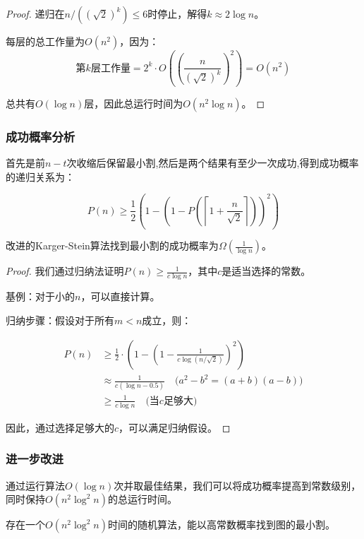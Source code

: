 \documentclass[lang=cn,newtx,10pt,scheme=chinese,chinesefont=nofont,citestyle=gb7714-2015, bibstyle=gb7714-2015]{elegantbook}
\begin{document}
\begin{refsection}
\begin{proof}
递归在$n/((\sqrt{2})^k) \leq 6$时停止，解得$k \approx 2 \log n$。

每层的总工作量为$O(n^2)$，因为：
\begin{equation*}
    \text{第}k\text{层工作量} = 2^k \cdot O\left(\left(\frac{n}{(\sqrt{2})^k}\right)^2\right) = O(n^2)
\end{equation*}

总共有$O(\log n)$层，因此总运行时间为$O(n^2 \log n)$。
\end{proof}

\subsubsection{成功概率分析}

首先是前$n-t$次收缩后保留最小割,然后是两个结果有至少一次成功,得到成功概率的递归关系为：

\begin{equation*}
    P(n) \geq \frac{1}{2}\left(1 - \left(1 -  P\left(\left\lceil 1 + \frac{n}{\sqrt{2}} \right\rceil\right)\right)^2\right)
\end{equation*}

\begin{theorem}
改进的Karger-Stein算法找到最小割的成功概率为$\Omega\left(\frac{1}{\log n}\right)$。
\end{theorem}

\begin{proof}
我们通过归纳法证明$P(n) \geq \frac{1}{c \log n}$，其中$c$是适当选择的常数。

基例：对于小的$n$，可以直接计算。

归纳步骤：假设对于所有$m < n$成立，则：

\begin{align*}
P(n) &\geq \frac{1}{2} \cdot\left(1 - \left(1 -  \frac{1}{c \log (n/\sqrt{2})}\right)^2\right) \\
&\approx \frac{1}{c (\log n - 0.5)} \quad \text{($a^2-b^2=(a+b)(a-b)$)} \\
&\geq \frac{1}{c \log n} \quad \text{(当$c$足够大)}
\end{align*}

因此，通过选择足够大的$c$，可以满足归纳假设。
\end{proof}

\subsubsection{进一步改进}

通过运行算法$O(\log n)$次并取最佳结果，我们可以将成功概率提高到常数级别，同时保持$O(n^2 \log^2 n)$的总运行时间。

\begin{corollary}
存在一个$O(n^2 \log^2 n)$时间的随机算法，能以高常数概率找到图的最小割。
\end{corollary}
\printbibliography[heading=subbibliography, title={本章参考文献}]
\end{refsection}
\end{document}
